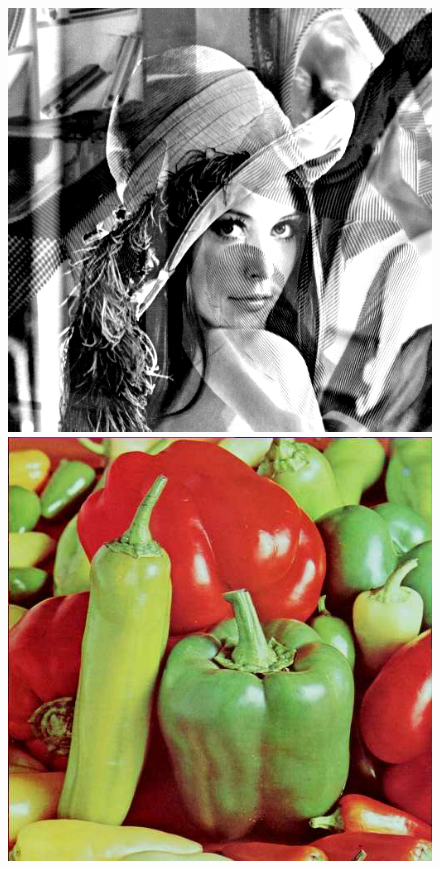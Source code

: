 \documentclass{article}
\begin{document}
\begin{figure}[!htb]
\includegraphics[scale=0.2]{img/_Mieszanie_Obrazow__lena_8bit_barbara_8bit.png}\\ 
\includegraphics[scale=0.2]{img/peppers_24bit.png}

\end{figure}
\end{document}
